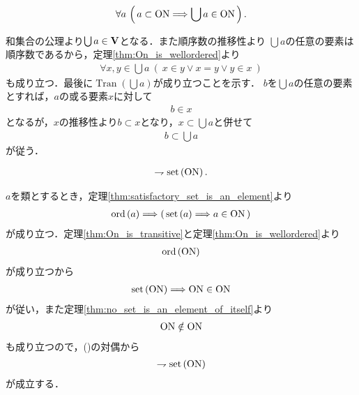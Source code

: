 	\begin{screen}
		\begin{thm}[$\ON$の部分集合の合併は順序数となる]\label{thm:union_of_set_of_ordinal_numbers_is_ordinal}
			\begin{align}
				\forall a\,
				\left(\, a \subset \mathrm{ON} \Longrightarrow \bigcup a \in \mathrm{ON}\, \right).
			\end{align}
		\end{thm}
	\end{screen}
	
	\begin{prf}
		和集合の公理より$\bigcup a \in \mathbf{V}$となる．また順序数の推移性より
		$\bigcup a$の任意の要素は順序数であるから，定理\ref{thm:On_is_wellordered}より
		\begin{align}
			\forall x,y \in \bigcup a\ (\ x \in y \vee x = y \vee y \in x\ )
		\end{align}
		も成り立つ．最後に$\operatorname{Tran}(\bigcup a)$が成り立つことを示す．
		$b$を$\bigcup a$の任意の要素とすれば，$a$の或る要素$x$に対して
		\begin{align}
			b \in x
		\end{align}
		となるが，$x$の推移性より$b \subset x$となり，$x \subset \bigcup a$と併せて
		\begin{align}
			b \subset \bigcup a
		\end{align}
		が従う．
		\QED
	\end{prf}
	
	\begin{screen}
		\begin{thm}\label{thm:Burali_Forti}
			\begin{align}
				\rightharpoondown \operatorname*{set} \left(\mathrm{ON}\right).
			\end{align}
		\end{thm}
	\end{screen}
	
	\begin{prf}
		$a$を類とするとき，定理\ref{thm:satisfactory_set_is_an_element}より
		\begin{align}
			\operatorname*{ord} \left(a\right) \Longrightarrow \left(\, \operatorname*{set} \left(a\right) \Longrightarrow a \in \mathrm{ON}\, \right)
		\end{align}
		が成り立つ．定理\ref{thm:On_is_transitive}と定理\ref{thm:On_is_wellordered}より
		\begin{align}
			\operatorname*{ord} \left(\mathrm{ON}\right)
		\end{align}
		が成り立つから
		\begin{align}
			\operatorname*{set} \left(\mathrm{ON}\right) \Longrightarrow \mathrm{ON} \in \mathrm{ON}
			\label{eq:Burali_Forti_1}
		\end{align}
		が従い，また定理\ref{thm:no_set_is_an_element_of_itself}より
		\begin{align}
			\mathrm{ON} \notin \mathrm{ON}
		\end{align}
		も成り立つので，()の対偶から
		\begin{align}
			\rightharpoondown \operatorname*{set} \left(\mathrm{ON}\right)
		\end{align}
		が成立する．
		\QED
	\end{prf}
	
